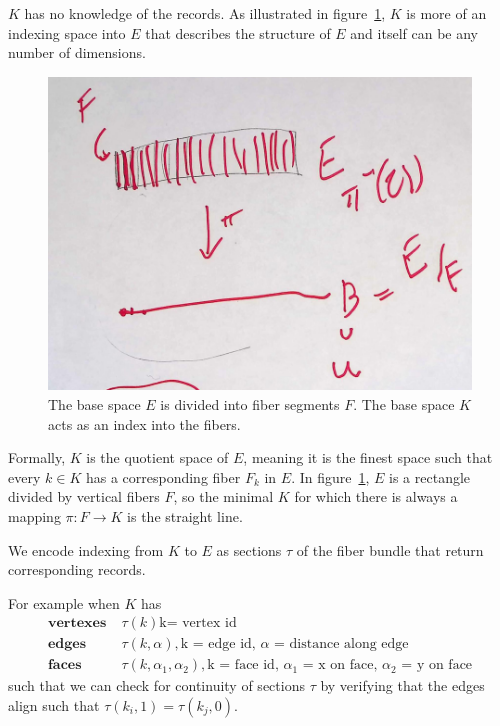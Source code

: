 \documentclass[../main.tex]{subfiles}
\begin{document}
$K$ has no knowledge of the records. As illustrated in figure~\ref{fig:base_space_div}, $K$ is more of an indexing space into $E$ that describes the structure of $E$ and itself can be any number of dimensions. 

\begin{figure}[ht!]
    \label{fig:base_space_div}
    \includegraphics[width=.5\linewidth]{figures/math/k_qspace.png}
    \caption{ The base space $E$ is divided into fiber segments $F$. The base space $K$ acts as an index into the fibers.}
\end{figure}

Formally, $K$ is the quotient space \cite{QuotientSpaceTopology2020} of $E$, meaning it is the finest space such that every $k \in K$ has a corresponding fiber $F_k$ in $E$. In figure~\ref{fig:base_space_div}, $E$ is a rectangle divided by vertical fibers $F$, so the minimal $K$ for which there is always a mapping $\pi: F\rightarrow K$ is the straight line. 

We encode indexing from $K$ to $E$ as sections $\tau$ of the fiber bundle that return corresponding records. 


For example when $K$ has
\begin{align*}
    \textbf{vertexes}\;& \tau(k) \text{k= vertex id}\\
    \textbf{edges}\;& \tau(k,\alpha), \text{k = edge id, $\alpha$ = distance along edge} \\
    \textbf{faces}\;& \tau(k,\alpha_1, \alpha_2), \text{k = face id, $\alpha_1$ = x on face, $\alpha_2$ = y on face}
\end{align*}
such that we can check for continuity of sections $\tau$ by verifying that the edges align such that $\tau(k_{i},1) = \tau(k_{j},0)$. 
\end{document}
